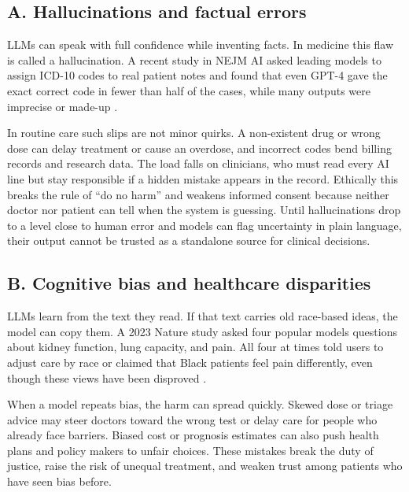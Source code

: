 \documentclass[12pt,a4paper]{scrreprt}
\begin{document}
\subsection*{A. Hallucinations and factual errors}
LLMs can speak with full confidence while inventing facts. In medicine this flaw is called a hallucination. A recent study in NEJM AI asked leading models to assign ICD-10 codes to real patient notes and found that even GPT-4 gave the exact correct code in fewer than half of the cases, while many outputs were imprecise or made-up \autocite{AINotReady2024,LLM3}.\par
\vspace{\baselineskip}
\noindent
In routine care such slips are not minor quirks. A non-existent drug or wrong dose can delay treatment or cause an overdose, and incorrect codes bend billing records and research data. The load falls on clinicians, who must read every AI line but stay responsible if a hidden mistake appears in the record. Ethically this breaks the rule of “do no harm” and weakens informed consent because neither doctor nor patient can tell when the system is guessing. Until hallucinations drop to a level close to human error and models can flag uncertainty in plain language, their output cannot be trusted as a standalone source for clinical decisions.

\subsection*{B. Cognitive bias and healthcare disparities}
LLMs learn from the text they read. If that text carries old race-based ideas, the model can copy them. A 2023 Nature study asked four popular models questions about kidney function, lung capacity, and pain. All four at times told users to adjust care by race or claimed that Black patients feel pain differently, even though these views have been disproved \autocite{Race}.\par
\vspace{\baselineskip}
\noindent
When a model repeats bias, the harm can spread quickly. Skewed dose or triage advice may steer doctors toward the wrong test or delay care for people who already face barriers. Biased cost or prognosis estimates can also push health plans and policy makers to unfair choices. These mistakes break the duty of justice, raise the risk of unequal treatment, and weaken trust among patients who have seen bias before.
\end{document}
